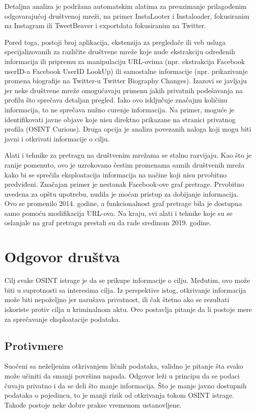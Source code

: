 \documentclass[a4paper, 11pt]{article}
\begin{document}
Detaljna analiza je podržana automatskim alatima za preuzimanje prilagođenim odgovarajućoj društvenoj mreži, na primer InstaLooter i Instaloader, fokusiranim na Instagram ili TweetBeaver i exportdata fokusiranim na Twitter.\newline

Pored toga, postoji broj aplikacija, ekstenzija za pregledače ili veb usluga specijalizovanih za različite društvene mreže koje nude ekstrakciju određenih informacija ili pripremu za manipulaciju URL-ovima (npr. ekstrakcija Facebook userID-a Facebook UserID LookUp) ili samostalne informacije (npr. prikazivanje promena biografije na Twitter-u Twitter Biography Changes). Izazovi se javljaju jer neke društvene mreže omogućavaju primenu jakih privatnih podešavanja na profilu što sprečava detaljan pregled. Iako ovo isključuje značajnu količinu informacija, to ne sprečava nužno curenje informacija. Na primer, moguće je identifikovati javne objave koje nisu direktno prikazane na stranici privatnog profila (OSINT Curious). Druga opcija je analiza povezanih naloga koji mogu biti javni i otkrivati informacije o cilju.\newline

Alati i tehnike za pretragu na društvenim mrežama se stalno razvijaju. Kao što je ranije pomenuto, ovo je uzrokovano čestim promenama samih društvenih mreža kako bi se sprečila eksploatacija informacija na načine koji nisu prvobitno predviđeni. Značajan primer je nestanak Facebook-ove graf pretrage. Prvobitno uvedena za opštu upotrebu, nudila je moćan pristup za dobijanje informacija. Ovo se promenilo 2014. godine, a funkcionalnost graf pretrage bila je dostupna samo pomoću modifikacija URL-ova. Na kraju, svi alati i tehnike koje su se oslanjale na graf pretragu prestali su da rade sredinom 2019. godine.\newpage
\section{Odgovor društva}
Cilj svake OSINT istrage je da se prikupe informacije o cilju. Međutim, ovo može biti u suprotnosti sa interesima cilja. Iz perspektive istog, otkrivanje informacija može biti nepoželjno jer narušava privatnost, ili čak štetno ako se rezultati iskoriste protiv cilja u kriminalnom aktu. Ovo postavlja pitanje da li postoje mere za sprečavanje eksploatacije podataka.
\subsection{Protivmere}
Suočeni sa neželjenim otkrivanjem ličnih podataka, validno je pitanje šta svako može učiniti da smanji površinu napada. Odgovor leži u principu da se podaci čuvaju privatno i da se deli što manje informacija. Što je manje javno dostupnih podataka o pojedincu, to je manji rizik od otkrivanja tokom OSINT istrage. Takođe postoje neke dobre prakse vremenom ustanovljene.\newline
\end{document}
